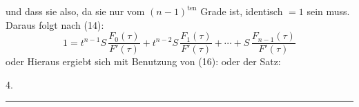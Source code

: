 und dass sie also, da sie nur vom $(n-1)^{\text{ten}}$ Grade ist, identisch $=1$ sein
muss. Daraus folgt nach (14):
\[
1 = t^{n-1} S\,\frac{F_0(\tau)}{F'(\tau)} + t^{n-2} S\,\frac{F_1(\tau)}{F'(\tau)} + \cdots + S\,\frac{F_{n-1}(\tau)}{F'(\tau)}
\]
oder
Hieraus ergiebt sich mit Benutzung von (16):
oder der Satz:

4. 

\begin{center}
\rule{0.2\linewidth}{0.4pt}
\end{center}
